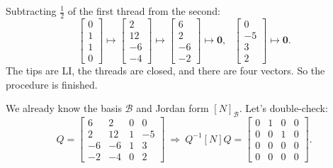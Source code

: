 \documentclass[12pt]{article}
\newcommand{\1}{\mathbf{1}}
\newcommand{\0}{\mathbf{0}}
\newcommand{\B}{\mathcal{B}}
\theoremstyle{definition}
\begin{document}
Subtracting $\frac{1}{2}$ of the first thread from the second:
\[
\left[\begin{matrix}0\\1\\1\\0\end{matrix}\right]
\mapsto
\left[\begin{matrix}2\\12\\-6\\-4\end{matrix}\right]
\mapsto
\left[\begin{matrix}6\\2\\-6\\-2\end{matrix}\right]
\mapsto
\0
, \ \ \
\left[\begin{matrix}0\\-5\\3\\2\end{matrix}\right]
\mapsto
\0
.
\]
The tips are LI, the threads are closed, and there are four vectors.
So the procedure is finished.

We already know the basis $ \B $ and Jordan form $ [N]_\B $.
Let's double-check:
\[
Q=
\left[\begin{matrix}6 & 2 & 0 & 0\\2 & 12 & 1 & -5\\-6 & -6 & 1 & 3\\-2 & -4 & 0 & 2\end{matrix}\right]
\
\Longrightarrow
\
Q^{-1} [N] Q = 
\left[\begin{array}{rrr|r} 0 & 1 & 0 & 0\\0 & 0 & 1 & 0\\0 & 0 & 0 & 0 \\ \hline 0 & 0 & 0 & 0\end{array}\right]
.
\]
\end{document}
